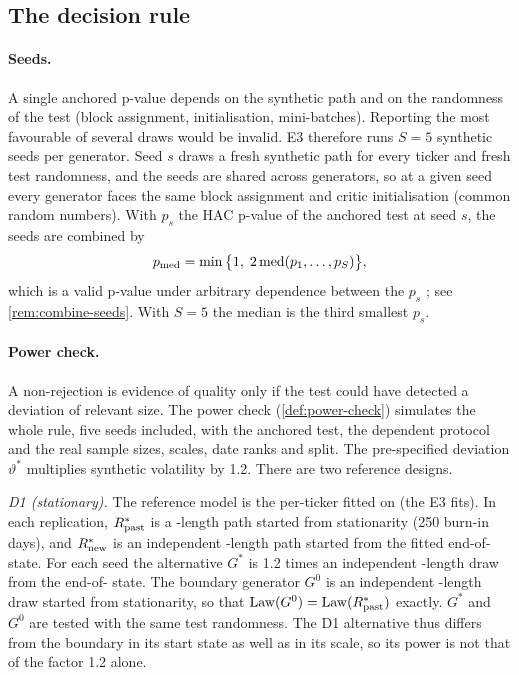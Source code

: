 \subsection{The decision rule}\label{sec:method-decision}

\paragraph{Seeds.}
A single anchored p-value depends on the synthetic path and on the randomness of the test (block
assignment, initialisation, mini-batches). Reporting the most favourable of several draws would
be invalid. E3 therefore runs $S=5$ synthetic seeds per generator. Seed $s$ draws a fresh
synthetic path for every ticker and fresh test randomness, and the seeds are shared across
generators, so at a given seed every generator faces the same block assignment and critic
initialisation (common random numbers). With $p_s$ the HAC p-value of the anchored test at seed
$s$, the seeds are combined by
\begin{equation}\label{eq:pmed}
  p_{\mathrm{med}}=\min\big\{1,\;2\operatorname{med}(p_1,\dots,p_S)\big\},
\end{equation}
which is a valid p-value under arbitrary dependence between the $p_s$
\citep{meinshausen_2009_pvalues}; see \cref{rem:combine-seeds}. With $S=5$ the median is the
third smallest $p_s$.

\paragraph{Power check.}
A non-rejection is evidence of quality only if the test could have detected a deviation of
relevant size. The power check (\cref{def:power-check}) simulates the whole rule, five seeds
included, with the anchored \WC{} test, the dependent protocol and the real sample sizes,
scales, date ranks and split. The pre-specified deviation $\vartheta^*$ multiplies synthetic
volatility by 1.2. There are two reference designs.

\emph{D1 (stationary).} The reference model is the per-ticker \GARCHt{} fitted on
\TRAIN{} (the E3 fits). In each replication, $R_{\mathrm{past}}^*$ is a \TRAIN{}-length path started
from stationarity (250 burn-in days), and $R_{\mathrm{new}}^*$ is an independent \TEST{}-length path
started from the fitted end-of-\TRAIN{} state. For each seed the alternative $G^*$ is 1.2
times an independent \TEST{}-length draw from the end-of-\TRAIN{} state. The boundary
generator $G^0$ is an independent \TEST{}-length draw started from stationarity, so that
$\operatorname{Law}(G^0)=\operatorname{Law}(R_{\mathrm{past}}^*)$ exactly. $G^*$ and $G^0$ are tested with the same test randomness.
The D1 alternative thus differs from the boundary in its start state as well as in its
scale, so its power is not that of the factor 1.2 alone.

